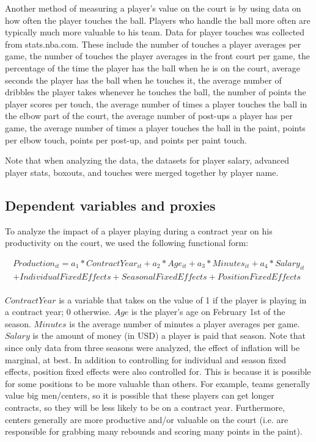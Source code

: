 \documentclass[12pt]{article}
\begin{document}
	Another method of measuring a player's value on the court is by using data on how often the player touches the ball. Players who handle the ball more often are typically much more valuable to his team. Data for player touches was collected from stats.nba.com. These include the number of touches a player averages per game, the number of touches the player averages in the front court per game, the percentage of the time the player has the ball when he is on the court, average seconds the player has the ball when he touches it, the average number of dribbles the player takes whenever he touches the ball, the number of points the player scores per touch, the average number of times a player touches the ball in the elbow part of the court, the average number of post-ups a player has per game, the average number of times a player touches the ball in the paint, points per elbow touch, points per post-up, and points per paint touch. 

	Note that when analyzing the data, the datasets for player salary, advanced player stats, boxouts, and touches were merged together by player name. 
	
	\subsection{Dependent variables and proxies}
	
	To analyze the impact of a player playing during a contract year on his productivity on the court, we used the following functional form:
	
	\[
	\begin{aligned}
	Production_{it} = a_1*ContractYear_{it} + a_2*Age_{it} + a_3*Minutes_{it} + a_4*Salary_{it}  \\
	+ IndividualFixedEffects + SeasonalFixedEffects + PositionFixedEffects \\
	\end{aligned}
	\]
	
	$ContractYear$ is a variable that takes on the value of 1 if the player is playing in a contract year; 0 otherwise. $Age$ is the player's age on February 1st of the season. $Minutes$ is the average number of minutes a player averages per game. $Salary$ is the amount of money (in USD) a player is paid that season. Note that since only data from three seasons were analyzed, the effect of inflation will be marginal, at best. In addition to controlling for individual and season fixed effects, position fixed effects were also controlled for. This is because it is possible for some positions to be more valuable than others. For example, teams generally value big men/centers, so it is possible that these players can get longer contracts, so they will be less likely to be on a contract year. Furthermore, centers generally are more productive and/or valuable on the court (i.e. are responsible for grabbing many rebounds and scoring many points in the paint). 
	
\end{document}
